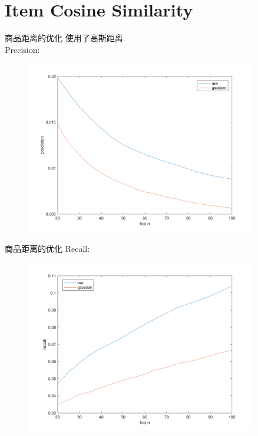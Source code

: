 \documentclass{beamer}
\begin{document}
  \section{Item Cosine Similarity}
  \begin{frame}{商品距离的优化}
    使用了高斯距离.\\
    Precision:
    \begin{figure}
      \centering
      \includegraphics[width=0.9\textwidth]{Nov-16/fig3.png}
    \end{figure}
  \end{frame}
    \begin{frame}{商品距离的优化}
    Recall:
    \begin{figure}
      \centering
      \includegraphics[width=0.9\textwidth]{Nov-16/fig4.png}
    \end{figure}
  \end{frame}
\end{document}
